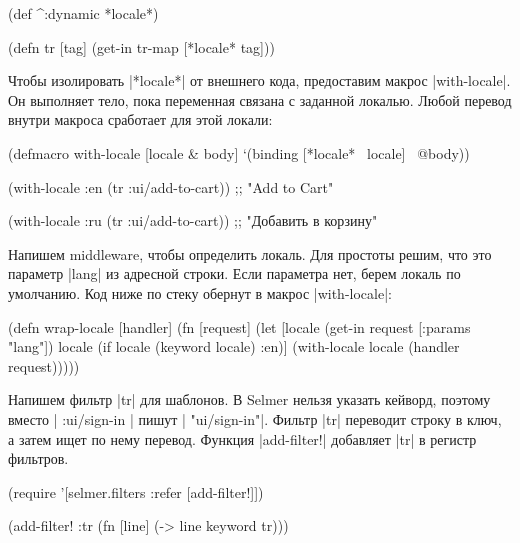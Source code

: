 \begin{english}
  \begin{clojure}
(def ^:dynamic *locale*)

(defn tr [tag]
  (get-in tr-map [*locale* tag]))
  \end{clojure}
\end{english}

Чтобы изолировать \spverb|*locale*| от внешнего кода, предоставим макрос
\spverb|with-locale|. Он выполняет тело, пока переменная связана с заданной
локалью. Любой перевод внутри макроса сработает для этой локали:

  \begin{clojure}
(defmacro with-locale
  [locale & body]
  `(binding [*locale* ~locale]
     ~@body))

(with-locale :en
  (tr :ui/add-to-cart))
;; "Add to Cart"

(with-locale :ru
  (tr :ui/add-to-cart))
;; "Добавить в корзину"
  \end{clojure}

Напишем middleware, чтобы определить локаль. Для простоты решим, что это
параметр \spverb|lang| из адресной строки. Если параметра нет, берем локаль по
умолчанию. Код ниже по стеку обернут в макрос \spverb|with-locale|:

\begin{english}
  \begin{clojure}
(defn wrap-locale [handler]
  (fn [request]
    (let [locale (get-in request [:params "lang"])
          locale (if locale
                   (keyword locale)
                   :en)]
      (with-locale locale
        (handler request)))))
  \end{clojure}
\end{english}

Напишем фильтр \spverb|tr| для шаблонов. В Selmer нельзя указать кейворд,
поэтому вместо \spverb|{{ :ui/sign-in }}| пишут \spverb|{{ "ui/sign-in"}}|.
Фильтр \spverb|tr| переводит строку в ключ, а затем ищет по нему
перевод. Функция \spverb|add-filter!| добавляет \spverb|tr| в регистр фильтров.

\begin{english}
  \begin{clojure}
(require '[selmer.filters :refer [add-filter!]])

(add-filter! :tr
 (fn [line]
   (-> line keyword tr)))
  \end{clojure}
\end{english}

